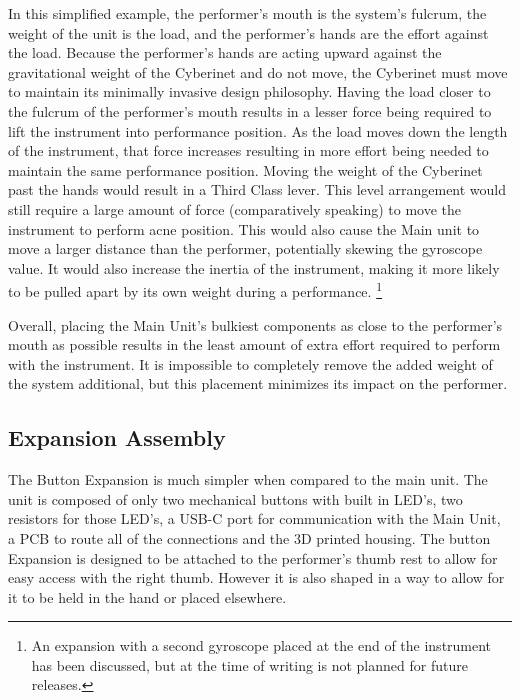 In this simplified example, the performer's mouth is the system's fulcrum, the weight of the unit is the load, and the performer's hands are the effort against the load. Because the performer's hands are acting upward against the gravitational weight of the Cyberinet and do not move, the Cyberinet must move to maintain its minimally invasive design philosophy. Having the load closer to the fulcrum of the performer's mouth results in a lesser force being required to lift the instrument into performance position\cite{Body Levers Webpage}. As the load moves down the length of the instrument, that force increases resulting in more effort being needed to maintain the same performance position. Moving the weight of the Cyberinet past the hands would result in a Third Class lever. This level arrangement would still require a large amount of force (comparatively speaking) to move the instrument to perform acne position\cite{Body Levers Webpage}. This would also cause the Main unit to move a larger distance than the performer, potentially skewing the gyroscope value\cite{Body Levers Webpage}. It would also increase the inertia of the instrument, making it more likely to be pulled apart by its own weight during a performance. \footnote{An expansion with a second gyroscope placed at the end of the instrument has been discussed, but at the time of writing is not planned for future releases.}

Overall, placing the Main Unit's bulkiest components as close to the performer's mouth as possible results in the least amount of extra effort required to perform with the instrument. It is impossible to completely remove the added weight of the system additional, but this placement minimizes its impact on the performer.




\subsection{Expansion Assembly}

The Button Expansion is much simpler when compared to the main unit. The unit is composed of only two mechanical buttons with built in LED's, two resistors for those LED's, a USB-C port for communication with the Main Unit, a PCB to route all of the connections and the 3D printed housing. The button Expansion is designed to be attached to the performer's thumb rest to allow for easy access with the right thumb. However it is also shaped in a way to allow for it to be held in the hand or placed elsewhere.

